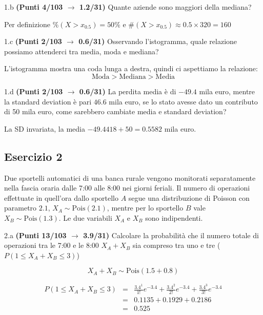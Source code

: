 \documentclass[
  11pt,
]{book}
\theoremstyle{mytheoremstyle}
\theoremstyle{mydefstyle}
\newenvironment{sol}
  {
  \begin{tcolorbox}[enhanced,breakable,arc=0.1mm,boxrule=1pt,colback=white,colframe=iblue,
  title=\bf \fontfamily{lmss}\selectfont \hspace{.5 cm} Soluzione,drop fuzzy shadow]

}{
\end{tcolorbox}
  }
\begin{document}
1.b \textbf{(Punti 4/103 \(\rightarrow\) 1.2/31)} Quante aziende sono maggiori della mediana?

\begin{sol}
Per definizione \(\%(X>x_{0.5})=50\%\) e
\(\#(X>x_{0.5})\approx0.5\times320 =160\)

\end{sol}

1.c \textbf{(Punti 2/103 \(\rightarrow\) 0.6/31)} Osservando l'istogramma, quale relazione possiamo attenderci tra media, moda e mediana?

\begin{sol}
L'istogramma mostra una coda lunga a destra, quindi ci aspettiamo la relazione:
\[
\text{Moda} > \text{Mediana} > \text{Media}
\]

\end{sol}

1.d \textbf{(Punti 2/103 \(\rightarrow\) 0.6/31)} La perdita media è di \(-49.4\) mila euro, mentre la standard deviation è pari \(46.6\) mila euro, se lo stato avesse dato un contributo di 50 mila euro, come sarebbero cambiate media e standard deviation?

\begin{sol}
La SD invariata, la media \(-49.4418+50=0.5582\) mila euro.

\end{sol}

\subsection{Esercizio 2}\label{esercizio-2-46}

Due sportelli automatici di una banca rurale vengono monitorati separatamente nella fascia oraria dalle 7:00 alle 8:00 nei giorni feriali.
Il numero di operazioni effettuate in quell'ora dallo sportello \(A\) segue una distribuzione di Poisson con parametro \(2.1\), \(X_A \sim \text{Pois}(2.1)\), mentre per lo sportello \(B\) vale \(X_B \sim \text{Pois}(1.3)\). Le due variabili \(X_A\) e \(X_B\) sono indipendenti.

2.a \textbf{(Punti 13/103 \(\rightarrow\) 3.9/31)} Calcolare la probabilità che il numero totale di operazioni tra le 7:00 e le 8:00 \(X_A + X_B\) sia compreso tra uno e tre (\(P(1\le X_A + X_B\le 3)\))

\begin{sol}
\[
X_A + X_B \sim \text{Pois}(1.5+0.8)
\]

\begin{eqnarray*}
   P(1\leq X_A+X_B \leq 3 ) &=& \frac{ 3.4 ^{ 1 }}{ 1 !}e^{- 3.4 }+\frac{ 3.4 ^{ 2 }}{ 2 !}e^{- 3.4 }+\frac{ 3.4 ^{ 3 }}{ 3 !}e^{- 3.4 } \\
   &=& 0.1135+0.1929+0.2186 \\
   &=& 0.525
\end{eqnarray*}

\end{sol}
\end{document}
